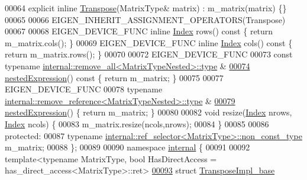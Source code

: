\begin{DoxyCode}
00064     \textcolor{keyword}{explicit} \textcolor{keyword}{inline} \hyperlink{group___core___module_class_eigen_1_1_transpose}{Transpose}(MatrixType& matrix) : m\_matrix(matrix) \{\}
00065 
00066     EIGEN\_INHERIT\_ASSIGNMENT\_OPERATORS(Transpose)
00067 
00068     EIGEN\_DEVICE\_FUNC \textcolor{keyword}{inline} \hyperlink{namespace_eigen_a62e77e0933482dafde8fe197d9a2cfde}{Index} rows()\textcolor{keyword}{ const }\{ \textcolor{keywordflow}{return} m\_matrix.cols(); \}
00069     EIGEN\_DEVICE\_FUNC \textcolor{keyword}{inline} \hyperlink{namespace_eigen_a62e77e0933482dafde8fe197d9a2cfde}{Index} cols()\textcolor{keyword}{ const }\{ \textcolor{keywordflow}{return} m\_matrix.rows(); \}
00070 
00072     EIGEN\_DEVICE\_FUNC
00073     \textcolor{keyword}{const} \textcolor{keyword}{typename} \hyperlink{group___sparse_core___module}{internal::remove\_all<MatrixTypeNested>::type}
      &
\hyperlink{group___core___module_a72aefbf67f5e3caf62a99f73409b4a63}{00074}     \hyperlink{group___core___module_a72aefbf67f5e3caf62a99f73409b4a63}{nestedExpression}()\textcolor{keyword}{ const }\{ \textcolor{keywordflow}{return} m\_matrix; \}
00075 
00077     EIGEN\_DEVICE\_FUNC
00078     \textcolor{keyword}{typename} \hyperlink{group___sparse_core___module}{internal::remove\_reference<MatrixTypeNested>::type}
      &
\hyperlink{group___core___module_a3265292cf912f401a32eea99975e47ea}{00079}     \hyperlink{group___core___module_a3265292cf912f401a32eea99975e47ea}{nestedExpression}() \{ \textcolor{keywordflow}{return} m\_matrix; \}
00080 
00082     \textcolor{keywordtype}{void} resize(\hyperlink{namespace_eigen_a62e77e0933482dafde8fe197d9a2cfde}{Index} nrows, \hyperlink{namespace_eigen_a62e77e0933482dafde8fe197d9a2cfde}{Index} ncols) \{
00083       m\_matrix.resize(ncols,nrows);
00084     \}
00085 
00086   \textcolor{keyword}{protected}:
00087     \textcolor{keyword}{typename} \hyperlink{class_eigen_1_1internal_1_1_tensor_lazy_evaluator_writable}{internal::ref\_selector<MatrixType>::non\_const\_type}
       m\_matrix;
00088 \};
00089 
00090 \textcolor{keyword}{namespace }\hyperlink{namespaceinternal}{internal} \{
00091 
00092 template<typename MatrixType, bool HasDirectAccess = has\_direct\_access<MatrixType>::ret>
\hyperlink{struct_eigen_1_1internal_1_1_transpose_impl__base}{00093} \textcolor{keyword}{struct }\hyperlink{struct_eigen_1_1internal_1_1_transpose_impl__base}{TransposeImpl\_base}

\end{DoxyCode}
